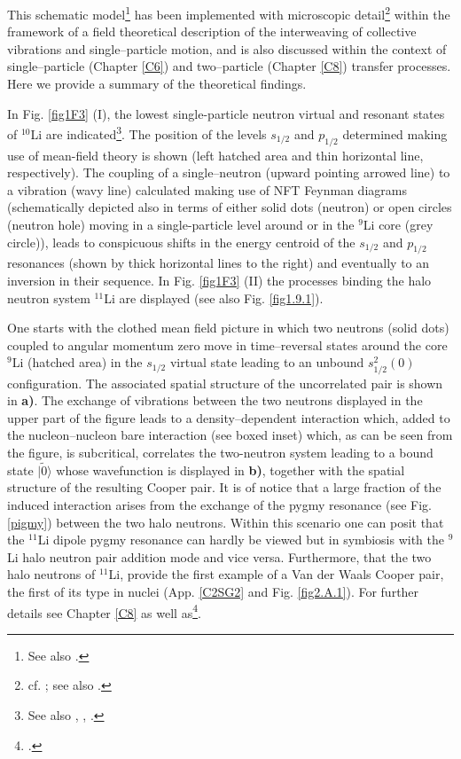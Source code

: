  
 
 This schematic model\footnote{See also \cite{Broglia:19b}.} has been implemented with microscopic detail\footnote{cf. \cite{Barranco:01}; see also \cite{Potel:10}.} within the framework of a field theoretical description of the interweaving of collective vibrations and single--particle motion, and is also discussed  within the context of single--particle (Chapter \ref{C6}) and two--particle (Chapter \ref{C8}) transfer processes. Here we provide a summary of the theoretical findings. 
 
 
 
 
 In Fig. \ref{fig1F3} (I), the lowest single-particle neutron virtual and resonant states of  $^{10}$Li are indicated\footnote{See also \cite{Cavallaro:17}, \cite{Barranco:19}, \cite{Moro:19}.}. The 
  position of the levels $s_{1/2}$ and $p_{1/2}$ determined making use
 of mean-field theory is shown (left hatched area and thin horizontal
 line, respectively). The coupling of a single--neutron (upward
 pointing arrowed line) to a vibration (wavy line) calculated
 making use of NFT Feynman diagrams 
 (schematically depicted also in terms of either solid dots (neutron)
 or open circles (neutron hole) moving in a single-particle
 level around or in the $^9$Li core (grey circle)), leads to conspicuous
 shifts in the energy centroid of the $s_{1/2}$ and $p_{1/2}$ resonances
 (shown by thick horizontal lines to the right) and eventually to
 an inversion in their sequence. In Fig. \ref{fig1F3} (II) the  processes binding the  halo neutron system $^{11}$Li are displayed (see also Fig. \ref{fig1.9.1}). 
 
 
 
 
 
  One starts with the clothed mean  field
 picture in which two neutrons (solid dots) coupled to angular momentum zero move in
 time--reversal states around the core $^{9}$Li (hatched area) in the
 $s_{1/2}$ virtual state leading to an unbound $s^2
 _{1/2}(0)$ configuration.  The associated spatial structure of the uncorrelated pair is shown in \textbf{a)}. The exchange
 of vibrations between the two neutrons displayed in the upper
 part of the figure leads to a density--dependent interaction
 which, added to the nucleon--nucleon bare interaction (see boxed inset) which, as can be seen from the figure, is subcritical, correlates the
 two-neutron system leading to a bound state $|\tilde 0\rangle$ whose wavefunction is  displayed in \textbf{b)}, together with the spatial structure of the resulting Cooper pair. It is of notice that a large fraction of the induced interaction arises from the exchange of the pygmy resonance (see Fig. \ref{pigmy}) between the two halo neutrons.  Within this scenario one can posit that the $^{11}$Li dipole pygmy resonance can hardly be viewed but in symbiosis with the $^{9}$Li halo neutron pair addition mode and vice versa. Furthermore, that the two halo neutrons of $^{11}$Li, provide the first example of a Van der Waals Cooper pair, the first of its type in nuclei (App. \ref{C2SG2} and Fig. \ref{fig2.A.1}). For further details see Chapter \ref{C8} as well as\footnote{\cite{Barranco:01}.}.
 
